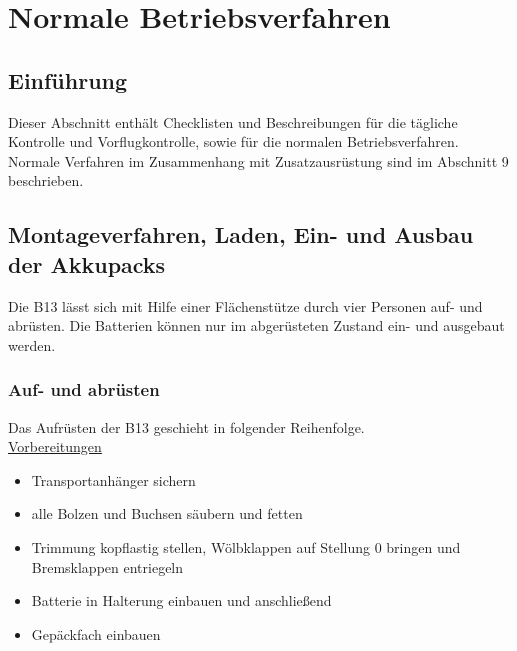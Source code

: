 \chapter{ Normale Betriebsverfahren}
\pagecolor{white}
\section{Einführung}
Dieser Abschnitt enthält Checklisten und Beschreibungen für die tägliche Kontrolle und Vorflugkontrolle, sowie für die normalen Betriebsverfahren. Normale Verfahren im Zusammenhang mit Zusatzausrüstung sind im Abschnitt 9 beschrieben.


\section{Montageverfahren, Laden, Ein- und Ausbau der Akkupacks}
Die B13 lässt sich mit Hilfe einer Flächenstütze durch vier Personen auf- und abrüsten. Die Batterien können nur im abgerüsteten Zustand ein- und ausgebaut werden.

\subsection{Auf- und abrüsten}
Das Aufrüsten der B13 geschieht in folgender Reihenfolge.\\
\newline
\underline{Vorbereitungen}
\begin{itemize}
\item Transportanhänger sichern
\item alle Bolzen und Buchsen säubern und fetten
\item Trimmung kopflastig stellen, Wölbklappen auf Stellung 0 bringen und Bremsklappen entriegeln
\item Batterie in Halterung einbauen und anschließend
\item Gepäckfach einbauen

\end{itemize}

